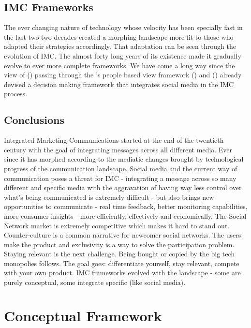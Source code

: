 \documentclass[11pt]{article}
\begin{document}
 \subsection{IMC Frameworks}\label{fw}
 
The ever changing nature of technology whose velocity has been specially fast in the last two two decades created a morphing landscape more fit to those who adapted their strategies accordingly. 	That adaptation can be seen through the evolution of IMC. The almost forty long years of its existence made it gradually evolve to ever more complete frameworks. We have come a long way since the view of \citeauthor{nowak} (\citeyear{nowak}) passing through the \citeauthor{kliatchko}'s people based view framework (\citeyear{kliatchko}) and \citeauthor{valos}  (\citeyear{valos}) already devised a decision making framework that integrates social media in the IMC process. 
 
  \subsection{Conclusions}\label{conclusions}
  
  Integrated Marketing Communications started at the end of the twentieth century with the goal of integrating messages across all different media. Ever since it has morphed according to the mediatic changes brought by technological progress of the communication landscape. Social media and the current way of communication poses a threat for IMC - integrating a message across so many different and specific media with the aggravation of having way less control over what’s being communicated is extremely difficult - but also brings new opportunities to communicate - real time feedback, better monitoring capabilities, more consumer insights - more efficiently, effectively and economically. The Social Network market is extremely competitive which makes it hard to stand out. Counter-culture is a common narrative for newcomer social networks. The users make the product and exclusivity is a way to solve the participation problem. Staying relevant is the next challenge. Being bought or copied by the big tech monopolies follows. The goal goes: differentiate yourself, stay relevant, compete with your own product. IMC frameworks evolved with the landscape - some are purely conceptual, some integrate specific (like social media). 
 


\section{Conceptual Framework}
\end{document}
